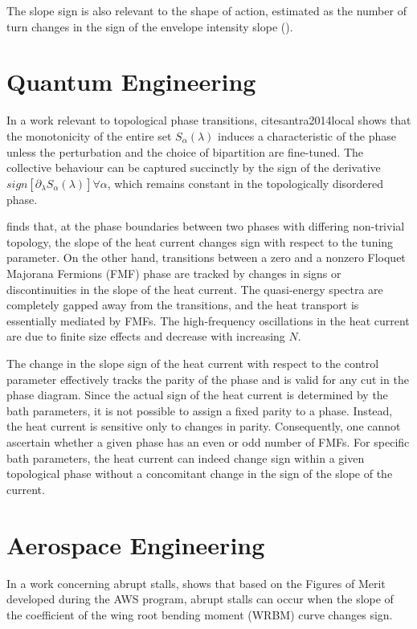 \documentclass[11pt]{book}
\begin{document}
The slope sign is also relevant to the shape of action, estimated as the number of turn changes in the sign of the envelope intensity slope (\cite{ngo2020research}).


\section{Quantum Engineering}
In a work relevant to topological phase transitions, cite{santra2014local} shows that the monotonicity of the entire set $S_{\alpha}\left(\lambda\right)$ induces a characteristic of the phase unless the perturbation and the choice of bipartition are fine-tuned. The collective behaviour can be captured succinctly by the sign of the derivative $sign\left[\partial_{\lambda}S_{\alpha}\left(\lambda\right)\right]\forall\alpha$, which remains constant in the topologically disordered phase.

\cite{molignini2017sensing} finds that, at the phase boundaries between two phases with differing non-trivial topology, the slope of the heat current changes sign with respect to the tuning parameter. On the other hand, transitions between a zero and a nonzero Floquet Majorana Fermions (FMF) phase are tracked by changes in signs or discontinuities in the slope of the heat current. The quasi-energy spectra are completely gapped away from the transitions, and the heat transport is essentially mediated by FMFs. The high-frequency oscillations in the heat current are due to finite size effects and decrease with increasing $N$. 

The change in the slope sign of the heat current with respect to the control parameter effectively tracks the parity of the phase and is valid for any cut in the phase diagram. Since the actual sign of the heat current is determined by the bath parameters, it is not possible to assign a fixed parity to a phase. Instead, the heat current is sensitive only to changes in parity. Consequently, one cannot ascertain whether a given phase has an even or odd number of FMFs. For specific bath parameters, the heat current can indeed change sign within a given topological phase without a concomitant change in the sign of the slope of the current.


\section{Aerospace Engineering}
In a work concerning abrupt stalls, \cite{green2005f} shows that based on the Figures of Merit developed during the AWS program, abrupt stalls can occur when the slope of the coefficient of the wing root bending moment (WRBM) curve changes sign. 
\end{document}
